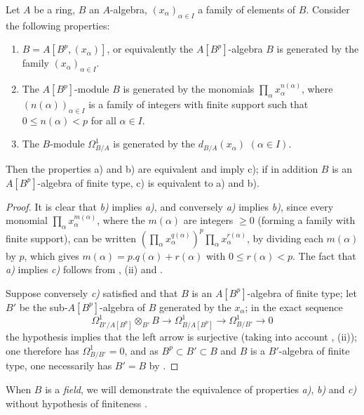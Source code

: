 \begin{proposition}[21.1.7]
\label{0.21.1.7}
Let $A$ be a ring, $B$ an $A$-algebra, $(x_\alpha)_{\alpha\in I}$ a family of elements of $B$.
Consider the following properties:
\begin{enumerate}
  \item[\rm a)] $B=A[B^p,(x_\alpha)]$, or equivalently the $A[B^p]$-algebra $B$ is generated by the family $(x_\alpha)_{\alpha\in I}$.
  \item[\rm b)] The $A[B^p]$-module $B$ is generated by the monomials $\prod_\alpha x_\alpha^{n(\alpha)}$, where $(n(\alpha))_{\alpha\in I}$ is a family of integers with finite support such that $0\leq n(\alpha)<p$ for all $\alpha\in I$.
  \item[\rm c)] The $B$-module $\Omega^1_{B/A}$ is generated by the $d_{B/A}(x_\alpha)$ $(\alpha\in I)$.
\end{enumerate}
Then the properties \textup{a)} and \textup{b)} are equivalent and imply \textup{c)}; if in addition $B$ is an $A[B^p]$-algebra of finite type, \textup{c)} is equivalent to \textup{a)} and \textup{b)}.
\end{proposition}

\begin{proof}
It is clear that \emph{b)} implies \emph{a)}, and conversely \emph{a)} implies \emph{b)}, since every monomial $\prod_\alpha x_\alpha^{m(\alpha)}$, where the $m(\alpha)$ are integers $\geq 0$ (forming a family with finite support), can be written $(\prod_\alpha x_\alpha^{q(\alpha)})^p\prod_\alpha x_\alpha^{r(\alpha)}$, by dividing each $m(\alpha)$ by $p$, which gives $m(\alpha)=p.q(\alpha)+r(\alpha)$ with $0\leq r(\alpha)<p$.
The fact that \emph{a)} implies \emph{c)} follows from , (ii) and .

Suppose conversely \emph{c)} satisfied and that $B$ is an $A[B^p]$-algebra of finite type; let $B'$ be the sub-$A[B^p]$-algebra of $B$ generated by the $x_\alpha$; in the exact sequence 
\[
  \Omega^1_{B'/A[B^p]}\otimes_{B'}B\to\Omega^1_{B/A[B^p]}\to\Omega^1_{B/B'}\to 0
\]
the hypothesis implies that the left arrow is surjective (taking into account , (ii)); one therefore has $\Omega^1_{B/B'}=0$, and as $B^p\subset B'\subset B$ and $B$ is a $B'$-algebra of finite type, one necessarily has $B'=B$ by .
\end{proof}

\begin{remark}[21.1.8]
\label{0.21.1.8}
When $B$ is a \emph{field}, we will demonstrate the equivalence of properties \emph{a)}, \emph{b)} and \emph{c)} without hypothesis of finiteness .
\end{remark}

